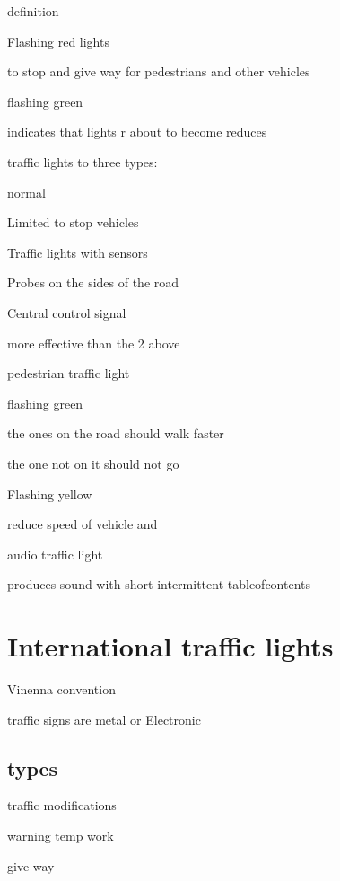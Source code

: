 \documentclass[openany]{book}
\begin{document}
definition

Flashing red lights

to stop and give way for pedestrians and other vehicles

flashing green

indicates that lights r about to become reduces

traffic lights to three types:

normal

Limited to stop vehicles

Traffic lights with sensors

Probes on the sides of the road

Central control signal

more effective than the 2 above

pedestrian traffic light

flashing green

the ones on the road should walk faster

the one not on it should not go

Flashing yellow

reduce speed of vehicle and

audio traffic light

produces sound with short intermittent tableofcontents


\chapter{International traffic lights}

Vinenna convention

traffic signs are metal or Electronic

\section{types}

traffic modifications

warning
temp work

give way
\end{document}
